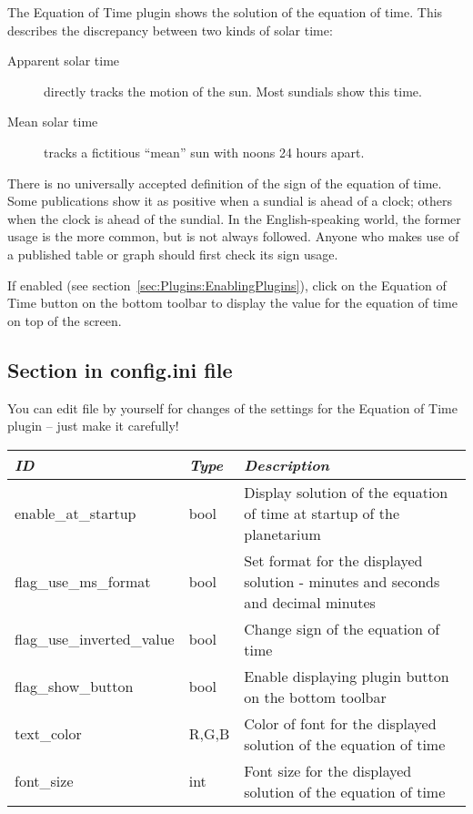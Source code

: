 \noindent The Equation of Time plugin shows the solution of the equation of time. %
This describes the discrepancy between two kinds of
solar time:
\begin{description}
\item[Apparent solar time] directly tracks the motion of the sun. Most sundials show this time.
\item[Mean solar time] tracks a fictitious ``mean'' sun with noons 24 hours apart. 
\end{description}

There is no universally accepted definition of the sign of the
equation of time. Some publications show it as positive when a sundial
is ahead of a clock; others when the clock is ahead of the sundial. In
the English-speaking world, the former usage is the more common, but
is not always followed. Anyone who makes use of a published table or
graph should first check its sign usage.

If enabled (see section~\ref{sec:Plugins:EnablingPlugins}), click on
the Equation of Time button 
on the bottom toolbar to display the value for the equation of time on
top of the screen.


\subsection{Section  in config.ini file}
\label{sec:plugins:EquationOfTime:config}

You can edit  file by yourself for changes of the
settings for the Equation of Time plugin -- just make it carefully!

\begin{longtabu} to \textwidth {l|l|X}\toprule
\emph{ID}            & \emph{Type} & \emph{Description}\\\midrule
enable\_at\_startup  & bool & Display solution of the equation of time at startup of the planetarium\\\midrule
flag\_use\_ms\_format & bool & Set format for the displayed solution - minutes and seconds and decimal minutes\\\midrule
flag\_use\_inverted\_value & bool & Change sign of the equation of time \\\midrule
flag\_show\_button & bool & Enable displaying plugin button on the bottom toolbar\\\midrule
text\_color & R,G,B & Color of font for the displayed solution of the equation of time\\\midrule
font\_size & int & Font size for the displayed solution of the equation of time \\\bottomrule
\end{longtabu}



